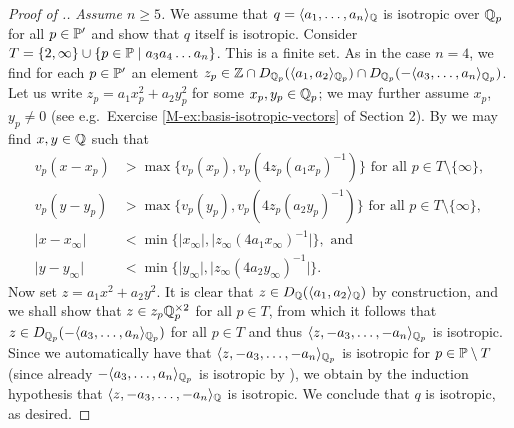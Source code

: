 \documentclass[12pt, leqno, british]{amsart}
\begin{document}
\begin{proof}[Proof of .]
\emph{Assume $n \geq 5$.}
We assume that $q = \langle a_1, \ldots, a_n \rangle_{\mathbb Q}$ is isotropic over $\mathbb Q_p$ for all $p \in \mathbb P'$ and show that $q$ itself is isotropic.
Consider $T = \lbrace 2, \infty \rbrace \cup \lbrace p \in \mathbb P \mid a_3a_4\ldots a_n \rbrace$.
This is a finite set.
As in the case $n = 4$, we find for each $p \in \mathbb P'$ an element $z_p \in \mathbb Z \cap D_{\mathbb Q_p}(\langle a_1, a_2 \rangle_{\mathbb Q_p}) \cap D_{\mathbb Q_p}(-\langle a_3, \ldots, a_n \rangle_{\mathbb Q_p})$.
Let us write $z_p = a_1x_p^2 + a_2y_p^2$ for some $x_p, y_p \in \mathbb Q_p$; we may further assume $x_p$, $y_p \neq 0$ (see e.g.~Exercise \eqref{M-ex:basis-isotropic-vectors} of Section 2).
By  we may find $x, y \in \mathbb Q$ such that
\begin{align*}
v_p(x - x_p) &> \max \lbrace v_p(x_p), v_p(4z_p(a_1x_p)^{-1}) \rbrace \text{ for all } p \in T \setminus \lbrace \infty \rbrace,\\
v_p(y - y_p) &> \max \lbrace v_p(y_p), v_p(4z_p(a_2y_p)^{-1}) \rbrace \text{ for all } p \in T \setminus \lbrace \infty \rbrace,\\
\lvert x - x_\infty \rvert &< \min \lbrace \lvert x_\infty \rvert, \lvert z_\infty (4a_1x_\infty)^{-1} \rvert \rbrace, \text{ and} \\
\lvert y - y_\infty \rvert &< \min \lbrace \lvert y_\infty \rvert, \lvert z_\infty (4a_2y_\infty)^{-1} \rvert \rbrace.
\end{align*}
Now set $z = a_1x^2 + a_2y^2$.
It is clear that $z \in D_\mathbb Q(\langle a_1, a_2 \rangle_\mathbb Q)$ by construction, and we shall show that $z \in z_p\mathbb Q_p^{\times 2}$ for all $p \in T$, from which it follows that $z \in D_{\mathbb Q_p}(-\langle a_3, \ldots, a_n \rangle_{\mathbb Q_p})$ for all $p \in T$ and thus $\langle z, -a_3, \ldots, -a_n \rangle_{\mathbb Q_p}$ is isotropic.
Since we automatically have that $\langle z, -a_3, \ldots, -a_n \rangle_{\mathbb Q_p}$ is isotropic for $p \in \mathbb P \setminus T$ (since already $-\langle a_3, \ldots, a_n \rangle_{\mathbb Q_p}$ is isotropic by ), we obtain by the induction hypothesis that $\langle z, -a_3, \ldots, -a_n \rangle_{\mathbb Q}$ is isotropic.
We conclude that $q$ is isotropic, as desired.


\end{proof}
\end{document}
